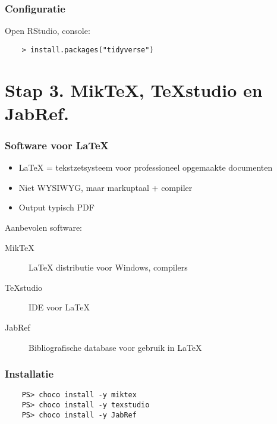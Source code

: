 \documentclass[aspectratio=169]{beamer}
\begin{document}
\begin{frame}[fragile]
  \frametitle{Configuratie}

  Open RStudio, console:

  \begin{verbatim}
    > install.packages("tidyverse")
  \end{verbatim}

\end{frame}

\section{Stap 3. MikTeX, TeXstudio en JabRef.}

\begin{frame}
  \frametitle{Software voor {\LaTeX}}

  \begin{itemize}
    \item {\LaTeX} = tekstzetsysteem voor professioneel opgemaakte documenten
    \item Niet WYSIWYG, maar markuptaal + compiler
    \item Output typisch PDF
  \end{itemize}

  \bigskip

  Aanbevolen software:

  \begin{description}
    \item[MikTeX] {\LaTeX} distributie voor Windows, compilers
    \item[TeXstudio]  IDE voor {\LaTeX}
    \item[JabRef] Bibliografische database voor gebruik in {\LaTeX}
  \end{description}

\end{frame}

\begin{frame}[fragile]
  \frametitle{Installatie}

  \begin{verbatim}
    PS> choco install -y miktex
    PS> choco install -y texstudio
    PS> choco install -y JabRef
  \end{verbatim}

\end{frame}
\end{document}
